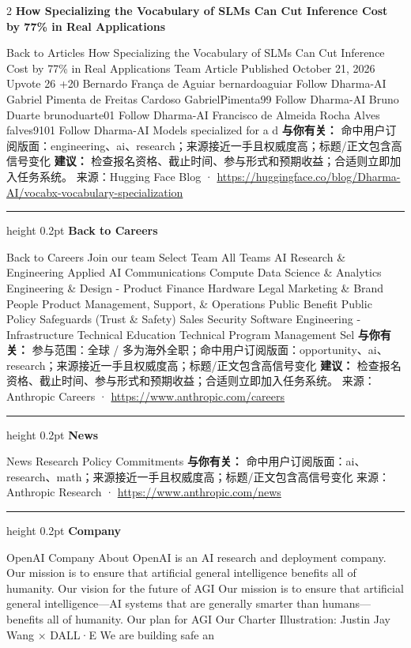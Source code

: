 \documentclass[10.5pt]{ctexart}
\begin{document}
\begin{multicols}{2}
{\large\bfseries How Specializing the Vocabulary of SLMs Can Cut Inference Cost by 77\% in Real Applications}\par
Back to Articles How Specializing the Vocabulary of SLMs Can Cut Inference Cost by 77\% in Real Applications Team Article Published October 21, 2026 Upvote 26 +20 Bernardo França de Aguiar bernardoaguiar Follow Dharma-AI Gabriel Pimenta de Freitas Cardoso GabrielPimenta99 Follow Dharma-AI Bruno Duarte brunoduarte01 Follow Dharma-AI Francisco de Almeida Rocha Alves falves9101 Follow Dharma-AI Models specialized for a d
\textbf{与你有关：} 命中用户订阅版面：engineering、ai、research；来源接近一手且权威度高；标题/正文包含高信号变化
\textbf{建议：} 检查报名资格、截止时间、参与形式和预期收益；合适则立即加入任务系统。
{\footnotesize\color{ormuted} 来源：Hugging Face Blog · \url{https://huggingface.co/blog/Dharma-AI/vocabx-vocabulary-specialization}}
\vspace{2mm}
\hrule height 0.2pt
\vspace{2mm}
{\large\bfseries Back to Careers}\par
Back to Careers Join our team Select Team All Teams AI Research \& Engineering Applied AI Communications Compute Data Science \& Analytics Engineering \& Design - Product Finance Hardware Legal Marketing \& Brand People Product Management, Support, \& Operations Public Benefit Public Policy Safeguards (Trust \& Safety) Sales Security Software Engineering - Infrastructure Technical Education Technical Program Management Sel
\textbf{与你有关：} 参与范围：全球 / 多为海外全职；命中用户订阅版面：opportunity、ai、research；来源接近一手且权威度高；标题/正文包含高信号变化
\textbf{建议：} 检查报名资格、截止时间、参与形式和预期收益；合适则立即加入任务系统。
{\footnotesize\color{ormuted} 来源：Anthropic Careers · \url{https://www.anthropic.com/careers}}
\vspace{2mm}
\hrule height 0.2pt
\vspace{2mm}
{\large\bfseries News}\par
News Research Policy Commitments
\textbf{与你有关：} 命中用户订阅版面：ai、research、math；来源接近一手且权威度高；标题/正文包含高信号变化
{\footnotesize\color{ormuted} 来源：Anthropic Research · \url{https://www.anthropic.com/news}}
\vspace{2mm}
\hrule height 0.2pt
\vspace{2mm}
{\large\bfseries Company}\par
OpenAI Company About OpenAI is an AI research and deployment company. Our mission is to ensure that artificial general intelligence benefits all of humanity. Our vision for the future of AGI Our mission is to ensure that artificial general intelligence—AI systems that are generally smarter than humans—benefits all of humanity. Our plan for AGI Our Charter Illustration: Justin Jay Wang × DALL·E We are building safe an

\end{multicols}
\end{document}

